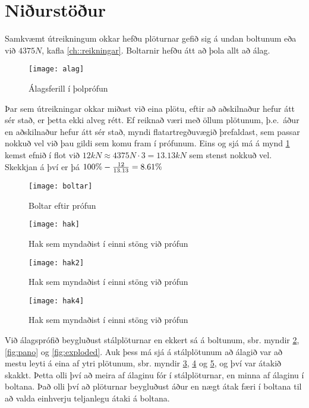
\section{Niðurstöður}
\label{sec:nidurstodur}

Samkvæmt útreikningum okkar hefðu plöturnar gefið sig á undan boltunum eða við $4375 N$, \sbr kafla \ref{ch::reikningar}.
Boltarnir hefðu átt að þola allt að  álag.

\begin{figure}[h]
  \centering
  \texttt{[image: alag]}
  \caption{Álagsferill í þolprófun}
  \label{fig:alag}
\end{figure}

Þar sem útreikningar okkar miðast við eina plötu, \te eftir að aðskilnaður hefur átt sér stað, er þetta ekki alveg rétt.
Ef reiknað væri með öllum plötunum, þ.e.~áður en aðskilnaður hefur átt sér stað, myndi flatartregðuvægið þrefaldast, sem passar nokkuð vel við þau gildi sem komu fram í prófunum.
Eins og sjá má á mynd \ref{fig:alag} kemst efnið í flot við \(12 kN \approx 4375 N \cdot 3 = 13.13 kN\) sem stenst nokkuð vel.
Skekkjan á því er þá \(100\% - {12 \over 13.13} = 8.61\% \)

\clearpage

\begin{figure}
  \centering
  \texttt{[image: boltar]}
  \caption{Boltar eftir prófun}
  \label{fig:boltar}
\end{figure}

\begin{figure}
  \centering
  \texttt{[image: hak]}
  \caption{Hak sem myndaðist í einni stöng við prófun}
  \label{fig:hak}
\end{figure}

\begin{figure}
  \centering
  \texttt{[image: hak2]}
  \caption{Hak sem myndaðist í einni stöng við prófun}
  \label{fig:hak2}
\end{figure}


\begin{figure}
  \centering
  \texttt{[image: hak4]}
  \caption{Hak sem myndaðist í einni stöng við prófun}
  \label{fig:hak4}
\end{figure}



Við álagsprófið beygluðust stálplöturnar en ekkert sá á boltunum, sbr. myndir \ref{fig:boltar}, \ref{fig:pano} og \ref{fig:exploded}.
Auk þess má sjá á stálplötunum að álagið var að mestu leyti á eina af ytri plötunum, sbr. myndir \ref{fig:hak}, \ref{fig:hak2} og \ref{fig:hak4}, og því var átakið skakkt. Þetta olli því að meira af álaginu fór í stálplöturnar, en minna af álaginu í boltana.
Það olli því að plöturnar beygluðust áður en nægt átak færi í boltana til að valda einhverju teljanlegu átaki á boltana.

